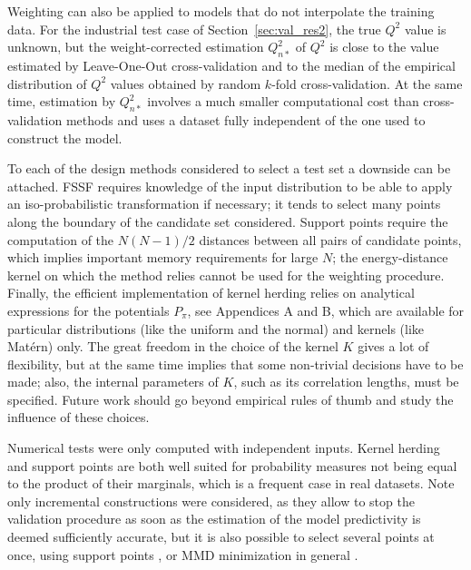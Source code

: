 Weighting can also be applied to models that do not interpolate the training data. 
For the industrial test case of Section~\ref{sec:val_res2}, the true $Q^2$ value is unknown, but the weight-corrected estimation $Q_{n*}^2$ of $Q^2$ is close to the value estimated by Leave-One-Out cross-validation and to the median of the empirical distribution of $Q^2$ values obtained by random $k$-fold cross-validation. 
At the same time, estimation by $Q_{n*}^2$ involves a much smaller computational cost than cross-validation methods and uses a dataset fully independent of the one used to construct the model. 

To each of the design methods considered to select a test set a downside can be attached. 
FSSF requires knowledge of the input distribution to be able to apply an iso-probabilistic transformation if necessary; it tends to select many points along the boundary of the candidate set considered. 
Support points require the computation of the $N(N-1)/2$ distances between all pairs of candidate points, which implies important memory requirements for large $N$; the energy-distance kernel on which the method relies cannot be used for the weighting procedure. 
Finally, the efficient implementation of kernel herding relies on analytical expressions for the potentials $P_{\pi}$, see Appendices A and B, which are available for particular distributions (like the uniform and the normal) and kernels (like Matérn) only. 
The great freedom in the choice of the kernel $K$ gives a lot of flexibility, but at the same time implies that some non-trivial decisions have to be made; also, the internal parameters of $K$, such as its correlation lengths, must be specified. 
Future work should go beyond empirical rules of thumb and study the influence of these choices.

Numerical tests were only computed with independent inputs. 
Kernel herding and support points are both well suited for probability measures not being equal to the product of their marginals, which is a frequent case in real datasets. 
Note only incremental constructions were considered, as they allow to stop the validation procedure as soon as the estimation of the model predictivity is deemed sufficiently accurate, but it is also possible to select several points at once, using support points \citep{mak_joseph_2018}, or MMD minimization in general \citep{teymur_gorham_2021}. 

